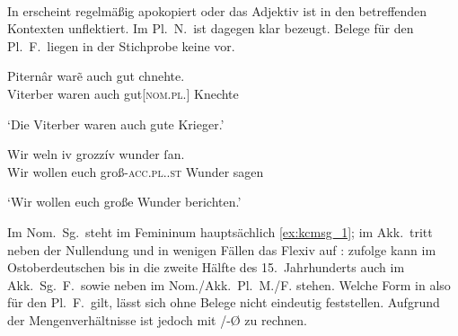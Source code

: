 \paragraph{\citet{kc:M}}
In \citet{kc:M} erscheint  regelmäßig apokopiert oder das Adjektiv ist
in den betreffenden Kontexten unflektiert. Im Pl.\ N.\ ist dagegen klar
 bezeugt. Belege für den Pl.\ F.\ liegen in der Stichprobe
keine vor.

\begin{exe}
\ex \label{ex:kcmpl}
	\begin{xlist}
	\ex \label{ex:kcmpl_1}
		\gll Piternâr warẽ auch gut chnehte. \\
			Viterber waren auch gut[\textsc{nom.pl.\MascM}] Knechte \\
		\begin{taggedline}{\parencites[\pno~32\vb, 34]{kc:M}[vgl.][4383]{schroeder1895}}
		\trans `Die Viterber waren auch gute Krieger.'
		\end{taggedline}

	\ex \label{ex:kcmpl_2}
		\gll Wir weln iv grozzív wunder ſan. \\
			Wir wollen euch groß-\textsc{acc.pl.\NeutI.st} Wunder sagen \\
		\begin{taggedline}{\parencites[\pno~14\va, 10]{kc:M}[vgl.][1839]{schroeder1895}}
		\trans `Wir wollen euch große Wunder berichten.'
		\end{taggedline}
	\end{xlist}
\end{exe}

Im Nom.\ Sg.\ steht im Femininum hauptsächlich  \cref{ex:kcmsg_1}; im
Akk.\ tritt neben der Nullendung und  in wenigen Fällen das Flexiv
 auf :
\citet[191--192]{reichmannwegera1993} zufolge kann im Ostoberdeutschen bis in die
zweite Hälfte des 15.~Jahrhunderts  auch im Akk.\ Sg.\ F.\ sowie
 neben  im Nom./Akk.\ Pl.\ M./F. stehen. Welche Form in
\citet{kc:M} also für den Pl.\ F.\ gilt, lässt sich ohne Belege nicht eindeutig
feststellen. Aufgrund der Mengenverhältnisse ist jedoch mit /-Ø zu
rechnen.


